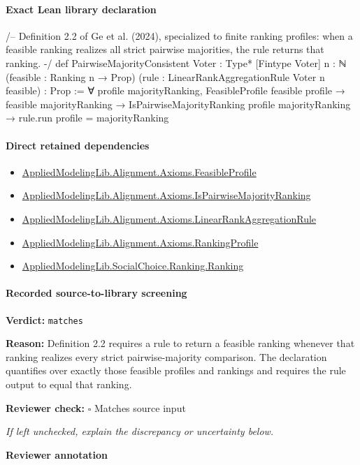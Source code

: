 \documentclass[10pt]{article}
\newcommand{\reviewerbox}{%
  \par\noindent\fbox{\parbox{0.96\linewidth}{\rule{0pt}{0.38in}}}\par
}
\newcommand{\reviewmatch}[1]{%
  \par\noindent\textbf{Reviewer check:} $\square$\; #1\par
  \noindent\emph{If left unchecked, explain the discrepancy or uncertainty below.}\par
}
\begin{document}
\paragraph{Exact Lean library declaration}
\begin{ReviewVerbatim}
/--
Definition 2.2 of Ge et al. (2024), specialized to finite ranking profiles:
when a feasible ranking realizes all strict pairwise majorities, the rule
returns that ranking.
-/
def PairwiseMajorityConsistent {Voter : Type*} [Fintype Voter] {n : ℕ}
    (feasible : Ranking n → Prop)
    (rule : LinearRankAggregationRule Voter n feasible) : Prop :=
  ∀ profile majorityRanking,
    FeasibleProfile feasible profile → feasible majorityRanking →
      IsPairwiseMajorityRanking profile majorityRanking → rule.run profile = majorityRanking
\end{ReviewVerbatim}

\paragraph{Direct retained dependencies}
\begin{itemize}\raggedright
\item \hyperlink{library-prerequisite-5fa7bdb49b050adf}{Applied\allowbreak{}Modeling\allowbreak{}Lib.\allowbreak{}Alignment.\allowbreak{}Axioms.\allowbreak{}Feasible\allowbreak{}Profile}
\item \hyperlink{governing-declaration-1d952514f8013a9b}{Applied\allowbreak{}Modeling\allowbreak{}Lib.\allowbreak{}Alignment.\allowbreak{}Axioms.\allowbreak{}Is\allowbreak{}Pairwise\allowbreak{}Majority\allowbreak{}Ranking}
\item \hyperlink{library-prerequisite-43447e121a1884f9}{Applied\allowbreak{}Modeling\allowbreak{}Lib.\allowbreak{}Alignment.\allowbreak{}Axioms.\allowbreak{}Linear\allowbreak{}Rank\allowbreak{}Aggregation\allowbreak{}Rule}
\item \hyperlink{library-prerequisite-9bded048a60dfe0a}{Applied\allowbreak{}Modeling\allowbreak{}Lib.\allowbreak{}Alignment.\allowbreak{}Axioms.\allowbreak{}Ranking\allowbreak{}Profile}
\item \hyperlink{library-prerequisite-5cde54446d1ae021}{Applied\allowbreak{}Modeling\allowbreak{}Lib.\allowbreak{}Social\allowbreak{}Choice.\allowbreak{}Ranking.\allowbreak{}Ranking}
\end{itemize}
\paragraph{Recorded source-to-library screening}
\textbf{Verdict:} \texttt{matches}
\\
{\raggedright
\textbf{Reason:} Definition 2.\allowbreak{}2 requires a rule to return a feasible ranking whenever that ranking realizes every strict pairwise-\allowbreak{}majority comparison.\allowbreak{} The declaration quantifies over exactly those feasible profiles and rankings and requires the rule output to equal that ranking.\allowbreak{}
\par}
\reviewmatch{Matches source input}
\noindent\textbf{Reviewer annotation}\par
\reviewerbox
\clearpage
\hypertarget{library-prerequisite-80fdf9d21d096dc8}{}
\end{document}
